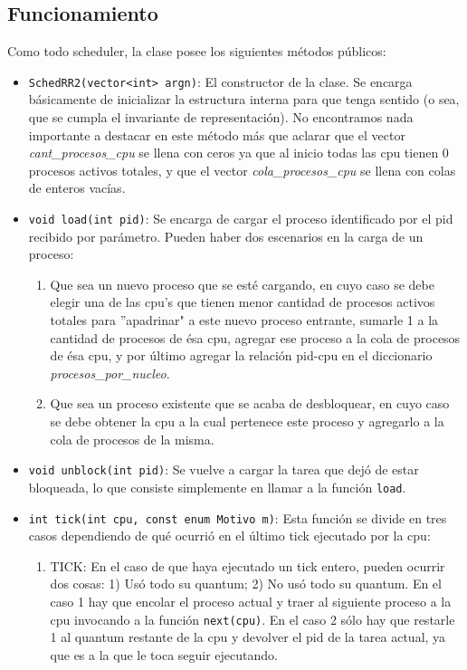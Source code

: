 \subsection{Funcionamiento} Como todo scheduler, la clase posee los siguientes m\'etodos p\'ublicos:
\begin{itemize}
	\item \texttt{SchedRR2(vector<int> argn)}: El constructor de la clase. Se encarga b\'asicamente de inicializar la estructura interna para que tenga sentido (o sea, que se cumpla el invariante de representaci\'on). No encontramos nada importante a destacar en este m\'etodo m\'as que aclarar que el vector \emph{cant\_procesos\_cpu} se llena con ceros ya que al inicio todas las cpu tienen 0 procesos activos totales, y que el vector \emph{cola\_procesos\_cpu} se llena con colas de enteros vac\'ias.
	\item \texttt{void load(int pid)}: Se encarga de cargar el proceso identificado por el pid recibido por par\'ametro. Pueden haber dos escenarios en la carga de un proceso:
	\begin{enumerate}
		\item Que sea un nuevo proceso que se est\'e cargando, en cuyo caso se debe elegir una de las cpu's que tienen menor cantidad de procesos activos totales para ''apadrinar" a este nuevo proceso entrante, sumarle 1 a la cantidad de procesos de \'esa cpu, agregar ese proceso a la cola de procesos de \'esa cpu, y por \'ultimo agregar la relaci\'on pid-cpu en el diccionario \emph{procesos\_por\_nucleo}.
		\item Que sea un proceso existente que se acaba de desbloquear, en cuyo caso se debe obtener la cpu a la cual pertenece este proceso y agregarlo a la cola de procesos de la misma.
	\end{enumerate}
	\item \texttt{void unblock(int pid)}: Se vuelve a cargar la tarea que dej\'o de estar bloqueada, lo que consiste simplemente en llamar a la funci\'on \texttt{load}.
	\item \texttt{int tick(int cpu, const enum Motivo m)}: Esta funci\'on se divide en tres casos dependiendo de qu\'e ocurri\'o en el \'ultimo tick ejecutado por la cpu:
	\begin{enumerate}
		\item TICK: En el caso de que haya ejecutado un tick entero, pueden ocurrir dos cosas: 1) Us\'o todo su quantum; 2) No us\'o todo su quantum. En el caso 1 hay que encolar el proceso actual y traer al siguiente proceso a la cpu invocando a la funci\'on \texttt{next(cpu)}. En el caso 2 s\'olo hay que restarle 1 al quantum restante de la cpu y devolver el pid de la tarea actual, ya que es a la que le toca seguir ejecutando.

\end{enumerate}
\end{itemize}
